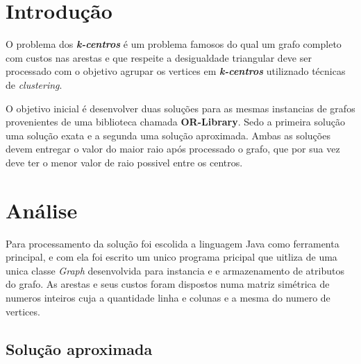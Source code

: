 \section{\esp Introdução}

O problema dos \emph{\textbf{k-centros}} é um problema famosos do qual um grafo completo com custos nas arestas e que respeite a desigualdade triangular
deve ser processado com o objetivo agrupar os vertices em \emph{\textbf{k-centros}}
utiliznado técnicas de \emph{clustering}.

O objetivo inicial é desenvolver duas soluções para as 
mesmas instancias de grafos provenientes de uma biblioteca chamada \textbf{OR-Library}. 
Sedo a primeira solução uma solução exata e a segunda uma solução aproximada. Ambas as soluções 
devem entregar o valor do maior raio após
processado o grafo, que por sua vez deve ter o menor valor de raio possivel entre os centros.

\section{\esp Análise}

	Para processamento da solução foi escolida a linguagem Java como ferramenta principal, e com ela 
	foi escrito um unico programa
	pricipal que uitliza de uma unica classe \emph{Graph} desenvolvida para instancia e e 
	armazenamento de atributos do grafo.
	As arestas e seus custos foram dispostos numa matriz simétrica de numeros 
	inteiros cuja a quantidade linha e colunas e a
	mesma do numero de vertices.

\subsection{\esp Solução aproximada}


